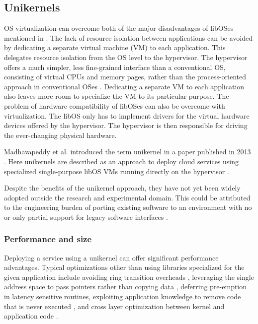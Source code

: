 \documentclass[10pt,twocolumn,a4paper]{article}
\begin{document}
  \subsection{Unikernels}
    OS virtualization can overcome both of the major disadvantages of libOSes
    mentioned in .
    The lack of resource isolation between applications can be avoided by
    dedicating a separate virtual machine (VM) to each application.
    This delegates resource isolation from the OS level to the hypervisor.
    The hypervisor offers a much simpler, less fine-grained interface than
    a conventional OS, consisting of virtual CPUs and memory pages, 
    rather than the process-oriented approach in conventional OSes \cite{madhavapeddy13-2}.
    Dedicating a separate VM to each application also leaves more room
    to specialize the VM to its particular purpose.
    The problem of hardware compatibility of libOSes can also be overcome
    with virtualization. The libOS only has to implement drivers for
    the virtual hardware devices offered by the hypervisor.
    The hypervisor is then responsible for driving the ever-changing physical
    hardware.

    Madhavapeddy et al. introduced the term unikernel in a paper 
    published in 2013 \cite{madhavapeddy13}.
    Here unikernels are described as an approach to deploy cloud services
    using specialized single-purpose libOS VMs running directly 
    on the hypervisor \cite{madhavapeddy13}.

    Despite the benefits of the unikernel approach, they have not yet been widely adopted
    outside the research and experimental domain.
    This could be attributed to the engineering burden of porting existing software
    to an environment with no or only partial support for legacy software interfaces \cite{raza19}.
    
    \subsubsection{Performance and size}
      Deploying a service using a unikernel can offer significant
      performance advantages.
      Typical optimizations other than using libraries specialized for the given
      application include avoiding ring transition overheads \cite{maeda2003},
      leveraging the single address space to pass pointers rather than copying data \cite {schatzberg16},
      deferring pre-emption in latency sensitive routines,
      exploiting application knowledge to remove code that is never executed \cite{madhavapeddy13},
      and cross layer optimization between kernel and application code \cite{raza19}.
\end{document}
